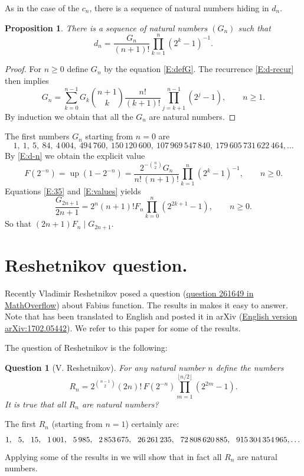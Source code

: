 \documentclass[10pt]{amsart}
\newtheorem{prop}[thm]{Proposition}
\newtheorem{quest}[thm]{Question}
\theoremstyle{definition}
\theoremstyle{remark}
\DeclareMathOperator\up{up}
\def\nn{\mskip12mu}
\begin{document}
As in the case of the $c_n$, there is a sequence of natural numbers hiding in 
$d_n$. 

\begin{prop}
There is a sequence of natural numbers $(G_n)$ such that 
\begin{equation}\label{E:defG}
d_n=\frac{G_n}{(n+1)!}\prod_{k=1}^n(2^k-1)^{-1}.
\end{equation}
\end{prop}

\begin{proof}
For $n\ge0$ define $G_n$ by the equation \eqref{E:defG}. The recurrence \eqref{E:d-recur}
then implies 
\[G_n=\sum_{k=0}^{n-1}G_k\binom{n+1}{k}\frac{n!}{(k+1)!}\prod_{j={k+1}}^{n-1}(2^j-1),\qquad n\ge1.\]
By induction we obtain that all the $G_n$ are natural numbers. 
\end{proof}
The first numbers $G_n$ starting from $n=0$ are 
\[1,\  1,\  5,\  84,\  4\,004,\   494\,760,\   150\,120\,600,\   107\,969\,547\,840,\   179\,605\,731\,622\,464, \dots\]
By \eqref{E:d-n} we obtain the explicit value
\begin{equation}\label{E:values}
F(2^{-n})=\up(1-2^{-n})=\frac{2^{-\binom{n}{2}}G_n}{n!\,(n+1)!}\prod_{k=1}^{n}(2^k-1)^{-1},\qquad n\ge0.
\end{equation} 
Equations \eqref{E:35} and \eqref{E:values} yields
\begin{equation}
\frac{G_{2n+1}}{2n+1}=2^n (n+1)! F_n\prod_{k=0}^n(2^{2k+1}-1),\qquad n\ge0.
\end{equation}
So that $(2n+1)F_n\mid G_{2n+1}$.





\section{Reshetnikov question.}


Recently Vladimir Reshetnikov posed a  question (\href{http://mathoverflow.net/questions/261649/a-conjecture-about-certain-values-of-the-fabius-function}{question 261649
in MathOverflow}) about Fabius function. The results in \cite{MR666839} makes it easy 
to answer. Note that \cite{MR666839} has been translated to English
and posted it in arXiv (\href{http://arxiv.org/abs/1702.05442}{English version arXiv:1702.05442}).
We refer
to this paper for some of the results.

The question of Reshetnikov  is
the following:

\begin{quest}[V. Reshetnikov]
For any natural number $n$ define the numbers
\begin{equation}\label{D:R}
R_n=2^{\binom{n-1}{2}}(2n)!\,F(2^{-n})\prod_{m=1}^{\lfloor n/2\rfloor}(2^{2m}-1).
\end{equation}
It is true that all $R_n$ are natural numbers?
\end{quest}
The first  $R_n$ (starting from $n=1$) certainly are:
\[1,\nn 5,\nn 15,\nn 1\,001,\nn 5\,985,\nn 2\,853\,675,\nn 26\,261\,235,\nn 72\,808\,620\,885,\nn 915\,304\,354\,965,\dots\]
Applying some of the results in \cite{MR666839} we will show that in fact all $R_n$ are
natural numbers. 
\end{document}
